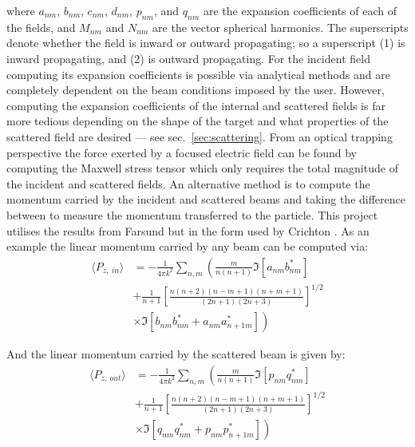 where $a_{nm}$, $b_{nm}$, $c_{nm}$, $d_{nm}$, $p_{nm}$, and $q_{nm}$
are the expansion coefficients of each of the fields, and $M_{nm}$ 
and $N_{nm}$ are the vector spherical harmonics. The superscripts
denote whether the field is inward or outward propagating; so a 
superscript (1) is inward propagating, and (2) is outward propagating.  
For the incident field computing its expansion coefficients is possible 
via analytical methods and are completely dependent on the beam 
conditions imposed by the user. However, computing the expansion 
coefficients of the internal and scattered fields is far more 
tedious depending on the shape of the target and what properties 
of the scattered field are desired --- see sec.~\ref{sec:scattering}.  
From an optical trapping perspective the force exerted by a focused 
electric field can be found by computing the Maxwell stress tensor 
which only requires the total magnitude of the incident and scattered 
fields. An alternative method is to compute the momentum carried by 
the incident and scattered beams and taking the difference between 
to measure the momentum transferred to the particle. This project 
utilises the results from Farsund \cite{Farsund1996} but in the 
form used by Crichton \cite{Crichton2000THEMD}. As an example the 
linear momentum carried by any beam can be computed via:
\begin{equation}
	\label{eq:linear_momentum_in}
	\begin{split}
		\langle P_{z,\ in} \rangle
		&=
		-\frac{1}{4\pi k^2}\sum_{n,m} \left(\frac{m}{n(n+1)}\Im[a_{nm}b^*_{nm}] \right.
		\\ 
		&+\frac{1}{n+1}\left[\frac{n(n+2)(n-m+1)(n+m+1)}{(2n+1)(2n+3)} \right]^{1/2}
		\\
		& \left.\times\Im[b_{nm}b^*_{nm}+a_{nm}a^*_{n+1m}] \right)
	\end{split}
\end{equation}

And the linear momentum carried by the scattered beam is given by:
\begin{equation}
	\label{eq:linear_momentum_out}
	\begin{split}
		\langle P_{z,\ out} \rangle
		&=
		-\frac{1}{4\pi k^2}\sum_{n,m} \left(\frac{m}{n(n+1)}\Im[p_{nm}q^*_{nm}] \right.
		\\ 
		&+\frac{1}{n+1}\left[\frac{n(n+2)(n-m+1)(n+m+1)}{(2n+1)(2n+3)} \right]^{1/2}
		\\
		& \left.\times\Im[q_{nm}q^*_{nm}+p_{nm}p^*_{n+1m}] \right)
	\end{split}
\end{equation}

